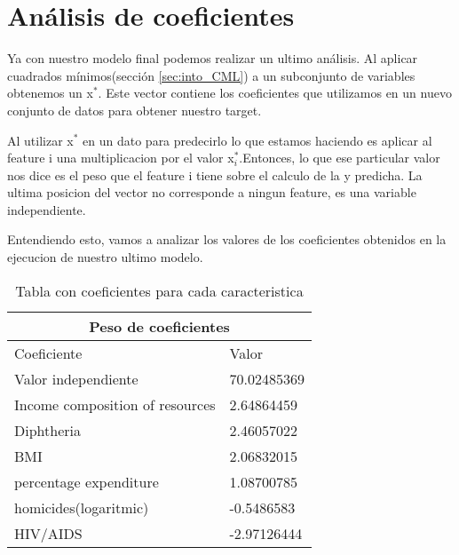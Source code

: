 \section{Análisis de coeficientes}
Ya con nuestro modelo final podemos realizar un ultimo análisis. Al aplicar cuadrados mínimos(sección \ref{sec:into_CML}) a un subconjunto de variables obtenemos un x$^*$. Este vector contiene los coeficientes que utilizamos en un nuevo conjunto de datos para obtener nuestro target.

Al utilizar x$^*$ en un dato para predecirlo lo que estamos haciendo es aplicar al feature i una multiplicacion por el valor x$^*_i$.Entonces, lo que ese particular valor nos dice es el peso que el feature i tiene sobre el calculo de la y predicha. La ultima posicion del vector no corresponde a ningun feature, es una variable independiente.

Entendiendo esto, vamos a analizar los valores de los coeficientes obtenidos en la ejecucion de nuestro ultimo modelo.


\begin{table}[H]
\centering
\begin{tabular}{ |p{4cm}||p{4cm}|  }
 \hline
 \multicolumn{2}{|c|}{Peso de coeficientes} \\
 \hline
 Coeficiente& Valor\\
 \hline
 Valor independiente   & 70.02485369\\
 Income composition of resources&2.64864459\\
 Diphtheria &2.46057022\\
 BMI    &2.06832015 \\
 percentage expenditure&1.08700785\\
 homicides(logaritmic)&-0.5486583\\
 HIV/AIDS&-2.97126444\\
 \hline
\end{tabular}
\caption{Tabla con coeficientes para cada caracteristica}
\label{fig:table_coef}
\end{table}


